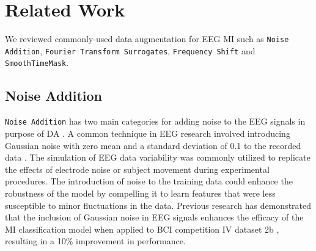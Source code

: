 \documentclass[runningheads]{llncs}
\begin{document}
\section{Related Work}
We reviewed commonly-used data augmentation for EEG MI such as \texttt{Noise Addition}, \texttt{Fourier Transform Surrogates}, \texttt{Frequency Shift} and \texttt{\texttt{SmoothTimeMask}}.

\subsection{Noise Addition}
\texttt{Noise Addition} has two main categories for adding noise to the EEG signals in purpose of DA \cite{lashgari2020data}.
A common technique in EEG research involved introducing Gaussian noise with zero mean and a standard deviation of 0.1 to the recorded data \cite{parvan2019transfer}.  The simulation of EEG data variability was commonly utilized to replicate the effects of electrode noise or subject movement during experimental procedures. The introduction of noise to the training data could enhance the robustness of the model by compelling it to learn features that were less susceptible to minor fluctuations in the data. Previous research has demonstrated that the inclusion of Gaussian noise in EEG signals enhances the efficacy of the MI classification model when applied to BCI competition IV dataset 2b \cite{leeb2008bci}, resulting in a 10\% improvement in performance.
\end{document}
